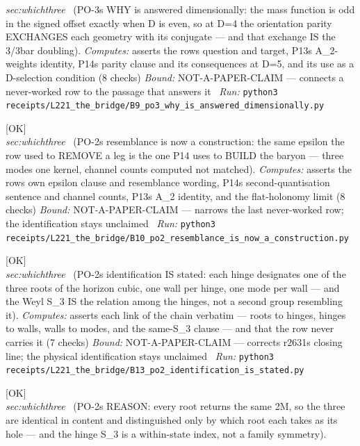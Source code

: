 \begin{description}
\textit{sec:whichthree} \ (PO-3s WHY is answered dimensionally: the mass function is odd in the signed offset exactly when D is even, so at D=4 the orientation parity EXCHANGES each geometry with its conjugate --- and that exchange IS the 3/3bar doubling). 
\emph{Computes:} asserts the rows question and target, P13s A\_2-weights identity, P14s parity clause and its consequences at D=5, and its use as a D-selection condition (8 checks)
 \emph{Bound:} NOT-A-PAPER-CLAIM --- connects a never-worked row to the passage that answers it
\ \emph{Run:} \texttt{python3 receipts/L221\_the\_bridge/B9\_po3\_why\_is\_answered\_dimensionally.py}
\item[\label{rcpt:B10_po2_resemblance_is_now_a_construction}\textbf{}\quad\texttt{B10\_po2\_resemblance\_is\_now\_a\_construction}]\hfill\textsf{[OK]}\\
\textit{sec:whichthree} \ (PO-2s resemblance is now a construction: the same epsilon the row used to REMOVE a leg is the one P14 uses to BUILD the baryon --- three modes one kernel, channel counts computed not matched). 
\emph{Computes:} asserts the rows own epsilon clause and resemblance wording, P14s second-quantisation sentence and channel counts, P13s A\_2 identity, and the flat-holonomy limit (8 checks)
 \emph{Bound:} NOT-A-PAPER-CLAIM --- narrows the last never-worked row; the identification stays unclaimed
\ \emph{Run:} \texttt{python3 receipts/L221\_the\_bridge/B10\_po2\_resemblance\_is\_now\_a\_construction.py}
\item[\label{rcpt:B13_po2_identification_is_stated}\textbf{}\quad\texttt{B13\_po2\_identification\_is\_stated}]\hfill\textsf{[OK]}\\
\textit{sec:whichthree} \ (PO-2s identification IS stated: each hinge designates one of the three roots of the horizon cubic, one wall per hinge, one mode per wall --- and the Weyl S\_3 IS the relation among the hinges, not a second group resembling it). 
\emph{Computes:} asserts each link of the chain verbatim --- roots to hinges, hinges to walls, walls to modes, and the same-S\_3 clause --- and that the row never carries it (7 checks)
 \emph{Bound:} NOT-A-PAPER-CLAIM --- corrects r2631s closing line; the physical identification stays unclaimed
\ \emph{Run:} \texttt{python3 receipts/L221\_the\_bridge/B13\_po2\_identification\_is\_stated.py}
\item[\label{rcpt:B14_identical_in_content_is_po2s_reason}\textbf{}\quad\texttt{B14\_identical\_in\_content\_is\_po2s\_reason}]\hfill\textsf{[OK]}\\
\textit{sec:whichthree} \ (PO-2s REASON: every root returns the same 2M, so the three are identical in content and distinguished only by which root each takes as its hole --- and the hinge S\_3 is a within-state index, not a family symmetry). 

\end{description}
